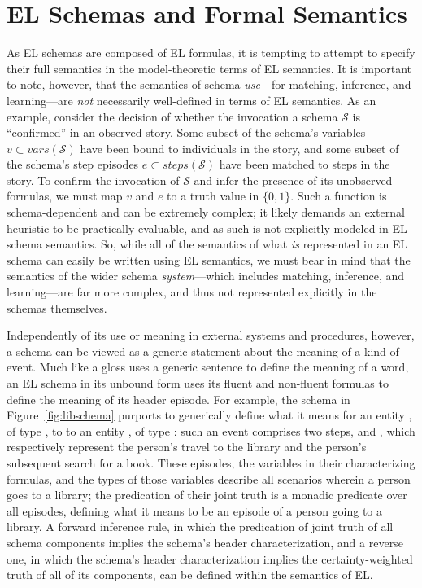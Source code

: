 \section{EL Schemas and Formal Semantics}
\label{sec:formal_semantics}
As EL schemas are composed of EL formulas, it is tempting to attempt to specify their full semantics in the model-theoretic terms of EL semantics. It is important to note, however, that the semantics of schema \textit{use}---for matching, inference, and learning---are \textit{not} necessarily well-defined in terms of EL semantics. As an example, consider the decision of whether the invocation a schema $\mathcal{S}$ is ``confirmed'' in an observed story. Some subset of the schema's variables $v \subset vars(\mathcal{S})$ have been bound to individuals in the story, and some subset of the schema's step episodes $e \subset steps(\mathcal{S})$ have been matched to steps in the story. To confirm the invocation of $\mathcal{S}$ and infer the presence of its unobserved formulas, we must map $v$ and $e$ to a truth value in $\{0, 1\}$. Such a function is schema-dependent and can be extremely complex; it likely demands an external heuristic to be practically evaluable, and as such is not explicitly modeled in EL schema semantics. So, while all of the semantics of what \textit{is} represented in an EL schema can easily be written using EL semantics, we must bear in mind that the semantics of the wider schema \textit{system}---which includes matching, inference, and learning---are far more complex, and thus not represented explicitly in the schemas themselves.

Independently of its use or meaning in external systems and procedures, however, a schema can be viewed as a generic statement about the meaning of a kind of event. Much like a gloss uses a generic sentence to define the meaning of a word, an EL schema in its unbound form uses its fluent and non-fluent formulas to define the meaning of its header episode. For example, the schema in Figure~\ref{fig:libschema} purports to generically define what it means for an entity , of type , to  to an entity , of type : such an event comprises two steps,  and , which respectively represent the person's travel to the library and the person's subsequent search for a book. These episodes, the variables in their characterizing formulas, and the types of those variables describe all scenarios  wherein a person goes to a library; the predication of their joint truth is a monadic predicate over all episodes, defining what it means to be an episode of a person going to a library. A forward inference rule, in which the predication of joint truth of all schema components implies the schema's header characterization, and a reverse one, in which the schema's header characterization implies the certainty-weighted truth of all of its components, can be defined within the semantics of EL.

